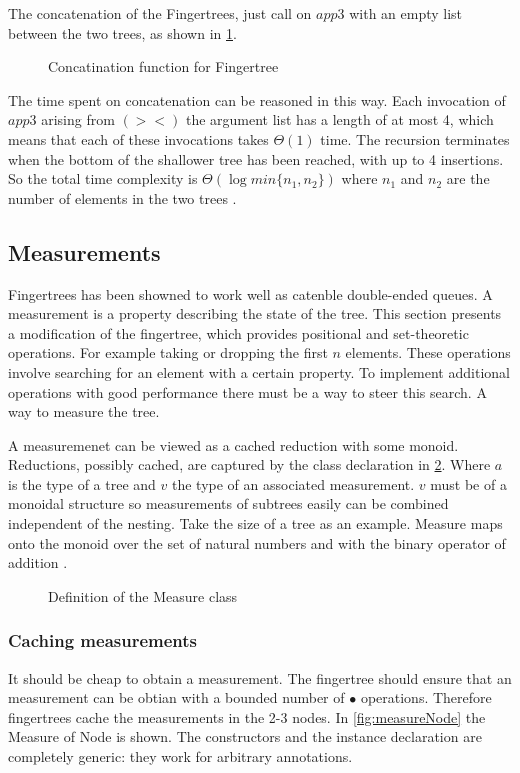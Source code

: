 The concatenation of the Fingertrees, just call on $app3$ with an empty list
between the two trees, as shown in \cref{fig:concat}.

\begin{figure}[h!]

\caption{Concatination function for Fingertree \label{fig:concat}}
\end{figure}

The time spent on concatenation can be reasoned in this way. Each invocation of
$app3$ arising from $(><)$ the argument list has a length of at most 4, which
means that each of these invocations takes $\Theta(1)$ time. The recursion
terminates when the bottom of the shallower tree has been reached, with up to
4 insertions. So the total time complexity is $\Theta(\log min\{n_1, n_2\})$
where $n_1$ and $n_2$ are the number of elements in the two trees
\cite{fingertree}.

\subsection{Measurements}
Fingertrees has been showned to work well as catenble double-ended queues. A 
measurement is a property describing the state of the tree. This section
presents a modification of the fingertree, which provides positional and
set-theoretic operations. For example taking or dropping the first $n$ elements.
These operations involve searching for an element with a certain property.
To implement additional operations with good performance there must be a way
to steer this search. A way to measure the tree.

A measuremenet can be viewed as a cached reduction with some monoid. 
Reductions, possibly cached, are captured by the class declaration in 
\cref{fig:measure}. Where $a$ is the type of a tree and $v$ the type of an
associated measurement. $v$ must be of a monoidal structure so measurements of
subtrees easily can be combined independent of the nesting. Take the size of a
tree as an example. Measure maps onto the monoid over the set of natural numbers
and with the binary operator of addition \cite{fingertree}.

\begin{figure}[h!]

\caption{Definition of the Measure class \label{fig:measure}}
\end{figure}

\subsubsection{Caching measurements}
It should be cheap to obtain a measurement. The fingertree should ensure that an
measurement can be obtian with a bounded number of $\bullet$ operations.
Therefore fingertrees cache the measurements in the 2-3 nodes. In
\cref{fig:measureNode} the Measure of Node is shown.
The constructors and the instance declaration are completely generic: they
work for arbitrary annotations.

